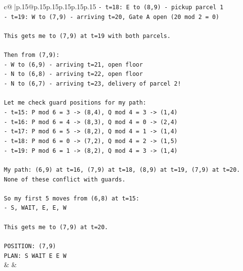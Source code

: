 \documentclass{article}
\begin{document}
{\begin{supertabular}{c@{$\;$}|p{.15\linewidth}@{}p{.15\linewidth}p{.15\linewidth}p{.15\linewidth}p{.15\linewidth}p{.15\linewidth}}
{{{\texttt{{-} t=18: E to (8,9) {-} pickup parcel 1} \\
\texttt{{-} t=19: W to (7,9) {-} arriving t=20, Gate A open (20 mod 2 = 0)} \\
\\ 
\texttt{This gets me to (7,9) at t=19 with both parcels.} \\
\\ 
\texttt{Then from (7,9):} \\
\texttt{{-} W to (6,9) {-} arriving t=21, open floor} \\
\texttt{{-} N to (6,8) {-} arriving t=22, open floor} \\
\texttt{{-} N to (6,7) {-} arriving t=23, delivery of parcel 2!} \\
\\ 
\texttt{Let me check guard positions for my path:} \\
\texttt{{-} t=15: P mod 6 = 3 {-}> (8,4), Q mod 4 = 3 {-}> (1,4)} \\
\texttt{{-} t=16: P mod 6 = 4 {-}> (8,3), Q mod 4 = 0 {-}> (2,4)} \\
\texttt{{-} t=17: P mod 6 = 5 {-}> (8,2), Q mod 4 = 1 {-}> (1,4)} \\
\texttt{{-} t=18: P mod 6 = 0 {-}> (7,2), Q mod 4 = 2 {-}> (1,5)} \\
\texttt{{-} t=19: P mod 6 = 1 {-}> (8,2), Q mod 4 = 3 {-}> (1,4)} \\
\\ 
\texttt{My path: (6,9) at t=16, (7,9) at t=18, (8,9) at t=19, (7,9) at t=20. None of these conflict with guards.} \\
\\ 
\texttt{So my first 5 moves from (6,8) at t=15:} \\
\texttt{{-} S, WAIT, E, E, W} \\
\\ 
\texttt{This gets me to (7,9) at t=20.} \\
\\ 
\texttt{POSITION: (7,9)} \\
\texttt{PLAN: S WAIT E E W} \\
            }
        }
    }
    & & \\ \\


\end{supertabular}}
\end{document}
